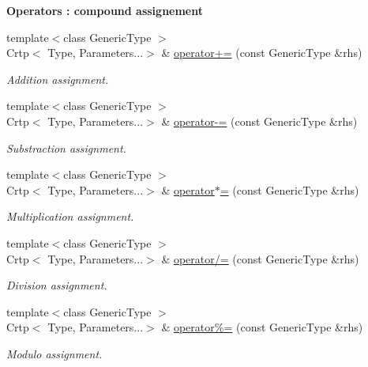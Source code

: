 \begin{Indent}{\bf Operators \-: compound assignement}\par
\begin{DoxyCompactItemize}
\item 
{\footnotesize template$<$class Generic\-Type $>$ }\\Crtp$<$ Type, Parameters...$>$ \& \hyperlink{classmagrathea_1_1StaticVectorizer_adeebb70a5bf1d4fe1e3c86fbd0830e1a}{operator+=} (const Generic\-Type \&rhs)
\begin{DoxyCompactList}\small\item\em Addition assignment. \end{DoxyCompactList}\item 
{\footnotesize template$<$class Generic\-Type $>$ }\\Crtp$<$ Type, Parameters...$>$ \& \hyperlink{classmagrathea_1_1StaticVectorizer_a1eb336da47554c90ce21eb1bba271630}{operator-\/=} (const Generic\-Type \&rhs)
\begin{DoxyCompactList}\small\item\em Substraction assignment. \end{DoxyCompactList}\item 
{\footnotesize template$<$class Generic\-Type $>$ }\\Crtp$<$ Type, Parameters...$>$ \& \hyperlink{classmagrathea_1_1StaticVectorizer_ae5ba80f798f95863f6e13d72d154b934}{operator$\ast$=} (const Generic\-Type \&rhs)
\begin{DoxyCompactList}\small\item\em Multiplication assignment. \end{DoxyCompactList}\item 
{\footnotesize template$<$class Generic\-Type $>$ }\\Crtp$<$ Type, Parameters...$>$ \& \hyperlink{classmagrathea_1_1StaticVectorizer_ac0d79a23a4ef654dd107c1682a5fa8d0}{operator/=} (const Generic\-Type \&rhs)
\begin{DoxyCompactList}\small\item\em Division assignment. \end{DoxyCompactList}\item 
{\footnotesize template$<$class Generic\-Type $>$ }\\Crtp$<$ Type, Parameters...$>$ \& \hyperlink{classmagrathea_1_1StaticVectorizer_a47c9e3e893460b9955602af8e30ef60c}{operator\%=} (const Generic\-Type \&rhs)
\begin{DoxyCompactList}\small\item\em Modulo assignment. \end{DoxyCompactList}\item 

\end{DoxyCompactItemize}
\end{Indent}
